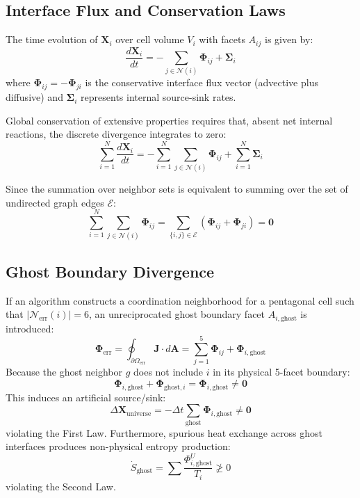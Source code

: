 \documentclass[10pt,twocolumn,a4paper]{article}
\begin{document}
\subsection{Interface Flux and Conservation Laws}

The time evolution of $\mathbf{X}_i$ over cell volume $V_i$ with facets $A_{ij}$ is given by:
\begin{equation}
\frac{d\mathbf{X}_i}{dt} = -\sum_{j \in \mathcal{N}(i)} \mathbf{\Phi}_{ij} + \mathbf{\Sigma}_i
\end{equation}
where $\mathbf{\Phi}_{ij} = -\mathbf{\Phi}_{ji}$ is the conservative interface flux vector (advective plus diffusive) and $\mathbf{\Sigma}_i$ represents internal source-sink rates.

Global conservation of extensive properties requires that, absent net internal reactions, the discrete divergence integrates to zero:
\begin{equation}
\sum_{i=1}^N \frac{d\mathbf{X}_i}{dt} = -\sum_{i=1}^N \sum_{j \in \mathcal{N}(i)} \mathbf{\Phi}_{ij} + \sum_{i=1}^N \mathbf{\Sigma}_i
\end{equation}

Since the summation over neighbor sets is equivalent to summing over the set of undirected graph edges $\mathcal{E}$:
\begin{equation}
\sum_{i=1}^N \sum_{j \in \mathcal{N}(i)} \mathbf{\Phi}_{ij} = \sum_{\{i,j\} \in \mathcal{E}} (\mathbf{\Phi}_{ij} + \mathbf{\Phi}_{ji}) = \mathbf{0}
\end{equation}

\subsection{Ghost Boundary Divergence}

If an algorithm constructs a coordination neighborhood for a pentagonal cell such that $|\mathcal{N}_{\text{err}}(i)| = 6$, an unreciprocated ghost boundary facet $A_{i, \text{ghost}}$ is introduced:
\begin{equation}
\mathbf{\Phi}_{\text{err}} = \oint_{\partial \Omega_{\text{err}}} \mathbf{J} \cdot d\mathbf{A} = \sum_{j=1}^5 \mathbf{\Phi}_{ij} + \mathbf{\Phi}_{i, \text{ghost}}
\end{equation}
Because the ghost neighbor $g$ does not include $i$ in its physical 5-facet boundary:
\begin{equation}
\mathbf{\Phi}_{i, \text{ghost}} + \mathbf{\Phi}_{\text{ghost}, i} = \mathbf{\Phi}_{i, \text{ghost}} \ne \mathbf{0}
\end{equation}
This induces an artificial source/sink:
\begin{equation}
\Delta \mathbf{X}_{\text{universe}} = -\Delta t \sum_{\text{ghost}} \mathbf{\Phi}_{i, \text{ghost}} \ne \mathbf{0}
\end{equation}
violating the First Law. Furthermore, spurious heat exchange across ghost interfaces produces non-physical entropy production:
\begin{equation}
\dot{S}_{\text{ghost}} = \sum \frac{\Phi_{i,\text{ghost}}^U}{T_i} \not\ge 0
\end{equation}
violating the Second Law.
\end{document}
